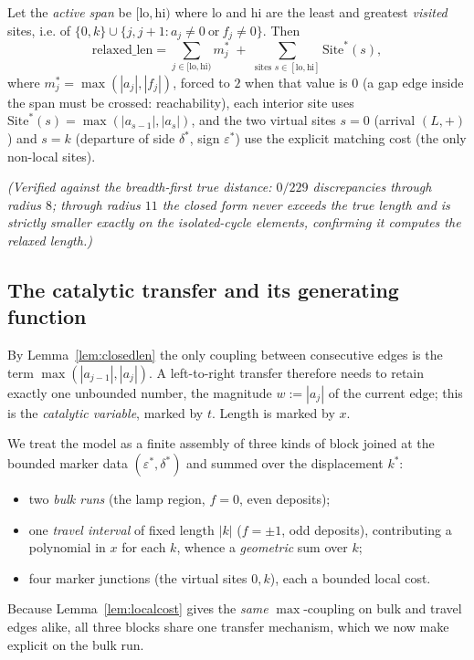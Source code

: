\begin{lemma}\label{lem:closedlen}
Let the \emph{active span} be $[\mathrm{lo},\mathrm{hi})$ where $\mathrm{lo}$ and
$\mathrm{hi}$ are the least and greatest \emph{visited} sites, i.e. of
$\{0,k\}\cup\{j,j+1: a_j\ne 0\ \text{or}\ f_j\ne 0\}$. Then
\[
   \mathrm{relaxed\_len}
   =\sum_{j\in[\mathrm{lo},\mathrm{hi})} m_j^\ast
   \;+\;\sum_{\text{sites }s\in[\mathrm{lo},\mathrm{hi}]}\mathrm{Site}^\ast(s),
\]
where $m_j^\ast=\max(|a_j|,|f_j|)$, forced to $2$ when that value is $0$ (a gap
edge inside the span must be crossed: reachability), each interior site uses
$\mathrm{Site}^\ast(s)=\max(|a_{s-1}|,|a_s|)$, and the two virtual sites $s=0$
(arrival $(L,+)$) and $s=k$ (departure of side $\delta^\ast$, sign
$\varepsilon^\ast$) use the explicit matching cost (the only non-local sites).
\end{lemma}

\noindent\emph{(Verified against the breadth-first true distance: $0/229$
discrepancies through radius $8$; through radius $11$ the closed form never
exceeds the true length and is strictly smaller exactly on the isolated-cycle
elements, confirming it computes the relaxed length.)}

\subsection{The catalytic transfer and its generating function}

By Lemma~\ref{lem:closedlen} the only coupling between consecutive edges is the
term $\max(|a_{j-1}|,|a_j|)$. A left-to-right transfer therefore needs to retain
exactly one unbounded number, the magnitude $w:=|a_j|$ of the current edge; this
is the \emph{catalytic variable}, marked by $t$. Length is marked by $x$.

We treat the model as a finite assembly of three kinds of block joined at the
bounded marker data $(\varepsilon^\ast,\delta^\ast)$ and summed over the
displacement $k^\ast$:
\begin{itemize}
\item two \emph{bulk runs} (the lamp region, $f=0$, even deposits);
\item one \emph{travel interval} of fixed length $|k|$ ($f=\pm1$, odd deposits),
      contributing a polynomial in $x$ for each $k$, whence a \emph{geometric}
      sum over $k$;
\item four marker junctions (the virtual sites $0,k$), each a bounded local cost.
\end{itemize}
Because Lemma~\ref{lem:localcost} gives the \emph{same} $\max$-coupling on bulk
and travel edges alike, all three blocks share one transfer mechanism, which we
now make explicit on the bulk run.

